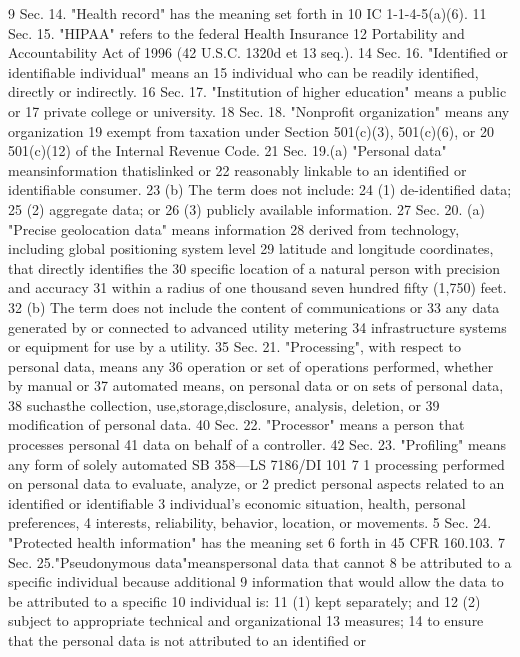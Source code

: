 9 Sec. 14. "Health record" has the meaning set forth in
10 IC 1-1-4-5(a)(6).
11 Sec. 15. "HIPAA" refers to the federal Health Insurance
12 Portability and Accountability Act of 1996 (42 U.S.C. 1320d et
13 seq.).
14 Sec. 16. "Identified or identifiable individual" means an
15 individual who can be readily identified, directly or indirectly.
16 Sec. 17. "Institution of higher education" means a public or
17 private college or university.
18 Sec. 18. "Nonprofit organization" means any organization
19 exempt from taxation under Section 501(c)(3), 501(c)(6), or
20 501(c)(12) of the Internal Revenue Code.
21 Sec. 19.(a) "Personal data" meansinformation thatislinked or
22 reasonably linkable to an identified or identifiable consumer.
23 (b) The term does not include:
24 (1) de-identified data;
25 (2) aggregate data; or
26 (3) publicly available information.
27 Sec. 20. (a) "Precise geolocation data" means information
28 derived from technology, including global positioning system level
29 latitude and longitude coordinates, that directly identifies the
30 specific location of a natural person with precision and accuracy
31 within a radius of one thousand seven hundred fifty (1,750) feet.
32 (b) The term does not include the content of communications or
33 any data generated by or connected to advanced utility metering
34 infrastructure systems or equipment for use by a utility.
35 Sec. 21. "Processing", with respect to personal data, means any
36 operation or set of operations performed, whether by manual or
37 automated means, on personal data or on sets of personal data,
38 suchasthe collection, use,storage,disclosure, analysis, deletion, or
39 modification of personal data.
40 Sec. 22. "Processor" means a person that processes personal
41 data on behalf of a controller.
42 Sec. 23. "Profiling" means any form of solely automated
SB 358—LS 7186/DI 101
7
1 processing performed on personal data to evaluate, analyze, or
2 predict personal aspects related to an identified or identifiable
3 individual's economic situation, health, personal preferences,
4 interests, reliability, behavior, location, or movements.
5 Sec. 24. "Protected health information" has the meaning set
6 forth in 45 CFR 160.103.
7 Sec. 25."Pseudonymous data"meanspersonal data that cannot
8 be attributed to a specific individual because additional
9 information that would allow the data to be attributed to a specific
10 individual is:
11 (1) kept separately; and
12 (2) subject to appropriate technical and organizational
13 measures;
14 to ensure that the personal data is not attributed to an identified or
